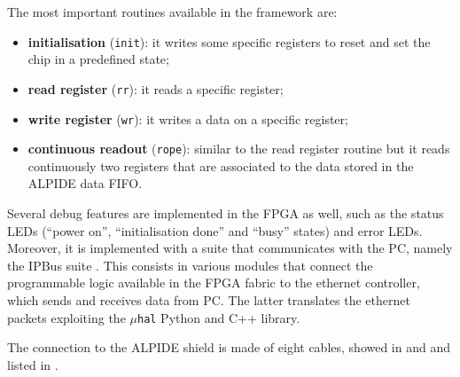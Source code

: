\documentclass[../../main/main.tex]{subfiles}
\begin{document}
The most important routines available in the framework are:
\begin{itemize}
    \item \textbf{initialisation} (\texttt{init}): it writes some specific registers to reset and set the chip in a predefined state;
    \item \textbf{read register} (\texttt{rr}): it reads a specific register;
    \item \textbf{write register} (\texttt{wr}): it writes a data on a specific register;
    \item \textbf{continuous readout} (\texttt{rope}): similar to the read register routine but it reads continuously two registers that are associated to the data stored in the ALPIDE data FIFO.
\end{itemize}
Several debug features are implemented in the FPGA as well, such as the status LEDs (``power on'', ``initialisation done'' and ``busy'' states) and error LEDs. Moreover, it is implemented with a suite that communicates with the PC, namely the IPBus suite \cite{IPBus}. This consists in various modules that connect the programmable logic available in the FPGA fabric to the ethernet controller, which sends and receives data from PC. The latter translates the ethernet packets exploiting the \texttt{$\mu$hal} Python and C++ library.

The connection to the ALPIDE shield is made of eight cables, showed in  and  and listed in .
\end{document}
